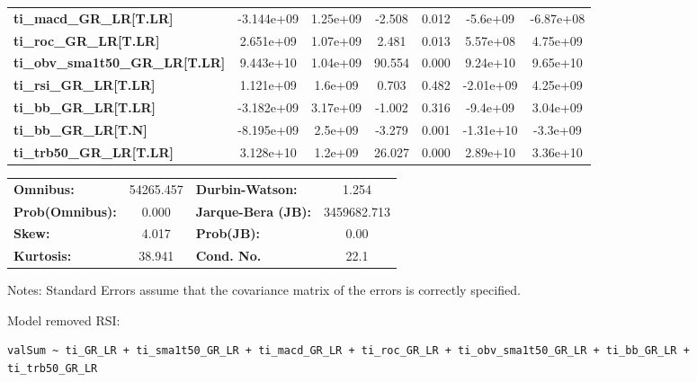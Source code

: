 \begin{center}
\begin{tabular}{lcccccc}
\textbf{ti\_macd\_GR\_LR[T.LR]}         &   -3.144e+09  &     1.25e+09     &    -2.508  &         0.012        &     -5.6e+09    &    -6.87e+08     \\
\textbf{ti\_roc\_GR\_LR[T.LR]}          &    2.651e+09  &     1.07e+09     &     2.481  &         0.013        &     5.57e+08    &     4.75e+09     \\
\textbf{ti\_obv\_sma1t50\_GR\_LR[T.LR]} &    9.443e+10  &     1.04e+09     &    90.554  &         0.000        &     9.24e+10    &     9.65e+10     \\
\textbf{ti\_rsi\_GR\_LR[T.LR]}          &    1.121e+09  &      1.6e+09     &     0.703  &         0.482        &    -2.01e+09    &     4.25e+09     \\
\textbf{ti\_bb\_GR\_LR[T.LR]}           &   -3.182e+09  &     3.17e+09     &    -1.002  &         0.316        &     -9.4e+09    &     3.04e+09     \\
\textbf{ti\_bb\_GR\_LR[T.N]}            &   -8.195e+09  &      2.5e+09     &    -3.279  &         0.001        &    -1.31e+10    &     -3.3e+09     \\
\textbf{ti\_trb50\_GR\_LR[T.LR]}        &    3.128e+10  &      1.2e+09     &    26.027  &         0.000        &     2.89e+10    &     3.36e+10     \\
\bottomrule
\end{tabular}
\begin{tabular}{lclc}
\textbf{Omnibus:}       & 54265.457 & \textbf{  Durbin-Watson:     } &      1.254   \\
\textbf{Prob(Omnibus):} &    0.000  & \textbf{  Jarque-Bera (JB):  } & 3459682.713  \\
\textbf{Skew:}          &    4.017  & \textbf{  Prob(JB):          } &       0.00   \\
\textbf{Kurtosis:}      &   38.941  & \textbf{  Cond. No.          } &       22.1   \\
\bottomrule
\end{tabular}
\end{center}

Notes: \newline
 [1] Standard Errors assume that the covariance matrix of the errors is correctly specified.

Model removed RSI: \begin{verbatim}valSum ~ ti_GR_LR + ti_sma1t50_GR_LR + ti_macd_GR_LR + ti_roc_GR_LR + ti_obv_sma1t50_GR_LR + ti_bb_GR_LR + ti_trb50_GR_LR\end{verbatim}

